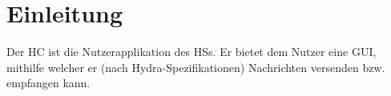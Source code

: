 \section{Einleitung}
Der \ac{HC} ist die Nutzerapplikation des \acp{HS}.
Er bietet dem Nutzer eine \ac{GUI}, mithilfe welcher er (nach Hydra-Spezifikationen) Nachrichten versenden bzw. empfangen kann.
\newpage
\newpage
\newpage
\newpage


